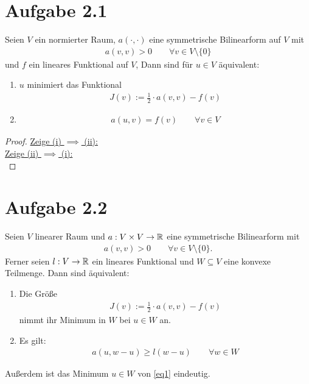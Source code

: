 \documentclass[12pt,a4paper]{article}
\author{Willi Sontopski}
\begin{document}

\section*{Aufgabe 2.1}
Seien $V$ ein normierter Raum, $a(\cdot,\cdot)$ eine symmetrische Bilinearform auf $V$ mit
\begin{align*}
a(v,v)>0\qquad\forall v\in V\setminus\lbrace0\rbrace
\end{align*}
und $f$ ein lineares Funktional auf $V$, Dann sind für $u\in V$ äquivalent:
\begin{enumerate}[label=(\roman*)]
\item $u$ minimiert das Funktional 
\begin{align}\label{Variationsproblem}\tag{Variationsproblem}
J(v):=\frac{1}{2}\cdot a(v,v)-f(v)
\end{align}
\item \begin{align}\label{Variationsgleichung}\tag{Variationsgleichung}
a(u,v)=f(v)\qquad\forall v\in V
\end{align}
\end{enumerate}

\begin{proof}
\underline{Zeige (i) $\implies$ (ii):}\\

\underline{Zeige (ii) $\implies$ (i):}\\

\end{proof}

\section*{Aufgabe 2.2}
Seien $V$ linearer Raum und $a:V\times V\to\mathbb{R}$ eine symmetrische Bilinearform mit
\begin{align*}
a(v,v)>0\qquad\forall v\in V\setminus\lbrace0\rbrace.
\end{align*}
Ferner seien $l:V\to\mathbb{R}$ ein lineares Funktional und $W\subseteq V$ eine konvexe Teilmenge. Dann sind äquivalent:
\begin{enumerate}[label=(\roman*)]
\item Die Größe
\begin{align}\label{eq1}
J(v):=\frac{1}{2}\cdot a(v,v)-f(v)
\end{align}
nimmt ihr Minimum in $W$ bei $u\in W$ an.
\item Es gilt:
\begin{align}\label{eq2}
a(u,w-u)\geq l(w-u)\qquad\forall w\in W
\end{align}
\end{enumerate}
Außerdem ist das Minimum $u\in W$ von \eqref{eq1} eindeutig.
\end{document}
